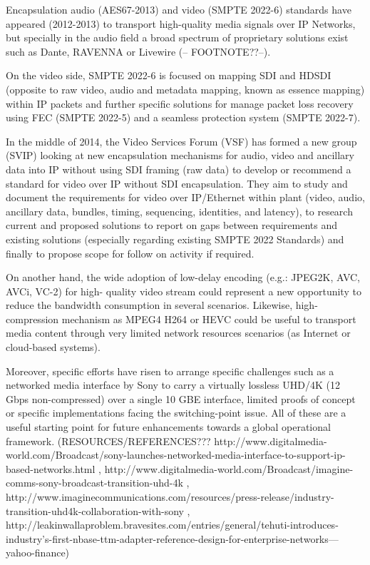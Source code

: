 Encapsulation audio (AES67-2013) and video (SMPTE 2022-6) standards have appeared (2012-2013) to transport high-quality media signals over IP Networks, but specially in the audio field a broad spectrum of proprietary solutions exist such as Dante, RAVENNA or Livewire (-- FOOTNOTE??--).

On the video side, SMPTE 2022-6 is focused on mapping SDI and HDSDI (opposite to raw video, audio and metadata mapping, known as essence mapping) within IP packets and further specific solutions for manage packet loss recovery using FEC (SMPTE 2022-5) and a seamless protection
system (SMPTE 2022-7).

In the middle of 2014, the Video Services Forum (VSF) has formed a new group (SVIP) looking at new encapsulation mechanisms for audio, video and ancillary data into IP without using SDI framing (raw data) to develop or recommend a standard for video over IP without SDI encapsulation.
They aim to study and document the requirements for video over IP/Ethernet within plant (video, audio, ancillary data, bundles, timing, sequencing, identities, and latency), to research current and proposed solutions to report on gaps between requirements and existing solutions (especially regarding existing SMPTE 2022 Standards) and finally to propose scope for follow on activity if required.

On another hand, the wide adoption of low-delay encoding (e.g.: JPEG2K, AVC, AVCi, VC-2) for high- quality video stream could represent a new opportunity to reduce the bandwidth consumption in several scenarios. Likewise, high-compression mechanism as MPEG4 H264 or HEVC could be
useful to transport media content through very limited network resources scenarios (as Internet or cloud-based systems).

Moreover, specific efforts have risen to arrange specific challenges such as a networked media interface by Sony to carry a virtually lossless UHD/4K (12 Gbps non-compressed) over a single 10 GBE interface, limited proofs of concept or specific implementations facing the switching-point issue. All of these are a useful starting point for future enhancements towards a global operational framework. (RESOURCES/REFERENCES??? http://www.digitalmedia-world.com/Broadcast/sony-launches-networked-media-interface-to-support-ip-based-networks.html , http://www.digitalmedia-world.com/Broadcast/imagine-comms-sony-broadcast-transition-uhd-4k , http://www.imaginecommunications.com/resources/press-release/industry-transition-uhd4k-collaboration-with-sony , http://leakinwallaproblem.bravesites.com/entries/general/tehuti-introduces-industry’s-first-nbase-ttm-adapter-reference-design-for-enterprise-networks---yahoo-finance)

